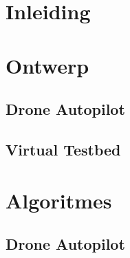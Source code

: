 \documentclass[tt]{penoverslag}
\begin{document}
\maketitlepage


\begin{abstract}



\end{abstract}


\tableofcontents\newpage

%


\rm 

\section*{Inleiding}
\label{sec:Inleiding}



\section{Ontwerp}
\label{sec:Ontwerp}



\subsection{Drone Autopilot}



\subsection{Virtual Testbed}



\section{Algoritmes}
\label{sec:Algoritmes}


\subsection{Drone Autopilot}
\label{sec:AlgoritmesAutopilot}

\end{document}
